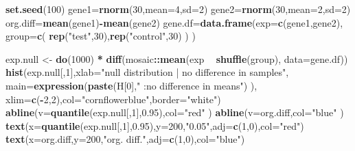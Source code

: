 \documentclass[12pt,]{krantz}
\newenvironment{Shaded}{\begin{snugshade}}{\end{snugshade}}
\newcommand{\DataTypeTok}[1]{\textcolor[rgb]{0.13,0.29,0.53}{#1}}
\newcommand{\DecValTok}[1]{\textcolor[rgb]{0.00,0.00,0.81}{#1}}
\newcommand{\FloatTok}[1]{\textcolor[rgb]{0.00,0.00,0.81}{#1}}
\newcommand{\KeywordTok}[1]{\textcolor[rgb]{0.13,0.29,0.53}{\textbf{#1}}}
\newcommand{\NormalTok}[1]{#1}
\newcommand{\OperatorTok}[1]{\textcolor[rgb]{0.81,0.36,0.00}{\textbf{#1}}}
\newcommand{\StringTok}[1]{\textcolor[rgb]{0.31,0.60,0.02}{#1}}
\begin{document}
\begin{Shaded}
\begin{Highlighting}[]
\KeywordTok{set.seed}\NormalTok{(}\DecValTok{100}\NormalTok{)}
\NormalTok{gene1=}\KeywordTok{rnorm}\NormalTok{(}\DecValTok{30}\NormalTok{,}\DataTypeTok{mean=}\DecValTok{4}\NormalTok{,}\DataTypeTok{sd=}\DecValTok{2}\NormalTok{)}
\NormalTok{gene2=}\KeywordTok{rnorm}\NormalTok{(}\DecValTok{30}\NormalTok{,}\DataTypeTok{mean=}\DecValTok{2}\NormalTok{,}\DataTypeTok{sd=}\DecValTok{2}\NormalTok{)}
\NormalTok{org.diff=}\KeywordTok{mean}\NormalTok{(gene1)}\OperatorTok{-}\KeywordTok{mean}\NormalTok{(gene2)}
\NormalTok{gene.df=}\KeywordTok{data.frame}\NormalTok{(}\DataTypeTok{exp=}\KeywordTok{c}\NormalTok{(gene1,gene2),}
                  \DataTypeTok{group=}\KeywordTok{c}\NormalTok{( }\KeywordTok{rep}\NormalTok{(}\StringTok{"test"}\NormalTok{,}\DecValTok{30}\NormalTok{),}\KeywordTok{rep}\NormalTok{(}\StringTok{"control"}\NormalTok{,}\DecValTok{30}\NormalTok{) ) )}


\NormalTok{exp.null <-}\StringTok{ }\KeywordTok{do}\NormalTok{(}\DecValTok{1000}\NormalTok{) }\OperatorTok{*}\StringTok{ }\KeywordTok{diff}\NormalTok{(mosaic}\OperatorTok{::}\KeywordTok{mean}\NormalTok{(exp }\OperatorTok{~}\StringTok{ }\KeywordTok{shuffle}\NormalTok{(group), }\DataTypeTok{data=}\NormalTok{gene.df))}
\KeywordTok{hist}\NormalTok{(exp.null[,}\DecValTok{1}\NormalTok{],}\DataTypeTok{xlab=}\StringTok{"null distribution | no difference in samples"}\NormalTok{,}
     \DataTypeTok{main=}\KeywordTok{expression}\NormalTok{(}\KeywordTok{paste}\NormalTok{(H[}\DecValTok{0}\NormalTok{],}\StringTok{" :no difference in means"}\NormalTok{) ),}
     \DataTypeTok{xlim=}\KeywordTok{c}\NormalTok{(}\OperatorTok{-}\DecValTok{2}\NormalTok{,}\DecValTok{2}\NormalTok{),}\DataTypeTok{col=}\StringTok{"cornflowerblue"}\NormalTok{,}\DataTypeTok{border=}\StringTok{"white"}\NormalTok{)}
\KeywordTok{abline}\NormalTok{(}\DataTypeTok{v=}\KeywordTok{quantile}\NormalTok{(exp.null[,}\DecValTok{1}\NormalTok{],}\FloatTok{0.95}\NormalTok{),}\DataTypeTok{col=}\StringTok{"red"}\NormalTok{ )}
\KeywordTok{abline}\NormalTok{(}\DataTypeTok{v=}\NormalTok{org.diff,}\DataTypeTok{col=}\StringTok{"blue"}\NormalTok{ )}
\KeywordTok{text}\NormalTok{(}\DataTypeTok{x=}\KeywordTok{quantile}\NormalTok{(exp.null[,}\DecValTok{1}\NormalTok{],}\FloatTok{0.95}\NormalTok{),}\DataTypeTok{y=}\DecValTok{200}\NormalTok{,}\StringTok{"0.05"}\NormalTok{,}\DataTypeTok{adj=}\KeywordTok{c}\NormalTok{(}\DecValTok{1}\NormalTok{,}\DecValTok{0}\NormalTok{),}\DataTypeTok{col=}\StringTok{"red"}\NormalTok{)}
\KeywordTok{text}\NormalTok{(}\DataTypeTok{x=}\NormalTok{org.diff,}\DataTypeTok{y=}\DecValTok{200}\NormalTok{,}\StringTok{"org. diff."}\NormalTok{,}\DataTypeTok{adj=}\KeywordTok{c}\NormalTok{(}\DecValTok{1}\NormalTok{,}\DecValTok{0}\NormalTok{),}\DataTypeTok{col=}\StringTok{"blue"}\NormalTok{)}
\end{Highlighting}
\end{Shaded}
\end{document}
